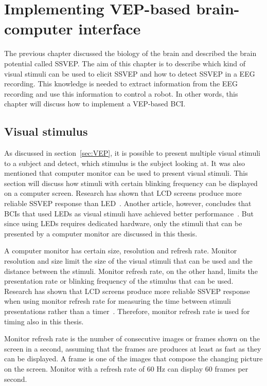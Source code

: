 
\chapter{Implementing VEP-based brain-computer interface}

The previous chapter discussed the biology of the brain and described the brain potential called \gls{SSVEP}. The aim of this chapter is to describe which kind of visual stimuli can be used to elicit \gls{SSVEP} and how to detect \gls{SSVEP} in a \gls{EEG} recording. This knowledge is needed to extract information from the \gls{EEG} recording and use this information to control a robot. In other words, this chapter will discuss how to implement a \gls{VEP}-based \gls{BCI}.

\section{Visual stimulus}
\label{sec:stimuli}

As discussed in section~\ref{sec:VEP}, it is possible to present multiple visual stimuli to a subject and detect, which stimulus is the subject looking at. It was also mentioned that computer monitor can be used to present visual stimuli. This section will discuss how stimuli with certain blinking frequency can be displayed on a computer screen. Research has shown that LCD screens produce more reliable \gls{SSVEP} response than \gls{LED}~\cite{lcd_lcd_led}. Another article, however, concludes that \glspl{BCI} that used \glspl{LED} as visual stimuli have achieved better performance~\cite{ssvep_stim}. But since using \glspl{LED} requires dedicated hardware, only the stimuli that can be presented by a computer monitor are discussed in this thesis.

A computer monitor has certain size, resolution and \gls{refresh rate}. Monitor resolution and size limit the size of the visual stimuli that can be used and the distance between the stimuli. Monitor \gls{refresh rate}, on the other hand, limits the presentation rate or blinking frequency of the stimulus that can be used. Research has shown that LCD screens produce more reliable \gls{SSVEP} response when using monitor \gls{refresh rate} for measuring the time between stimuli presentations rather than a timer~\cite{lcd_lcd_led}. Therefore, monitor \gls{refresh rate} is used for timing also in this thesis.

Monitor \gls{refresh rate} is the number of consecutive images or \glspl{frame} shown on the screen in a second, assuming that the \glspl{frame} are produces at least as fast as they can be displayed. A \gls{frame} is one of the images that compose the changing picture on the screen. Monitor with a \gls{refresh rate} of 60 Hz can display 60 \glspl{frame} per second. 

